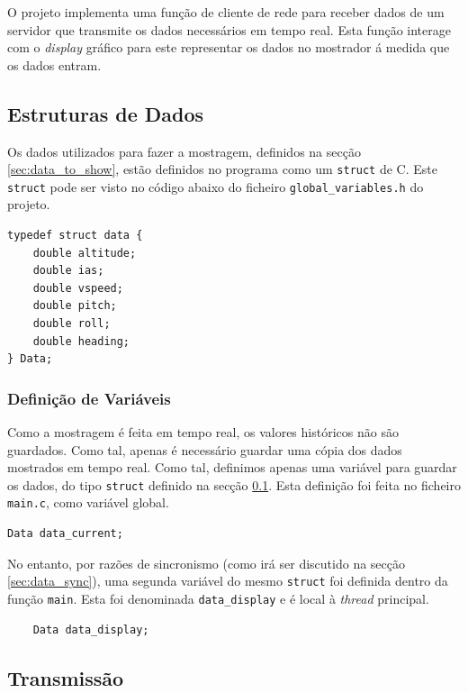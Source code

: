 \documentclass[palatino]{ist-report}
\begin{document}
O projeto implementa uma função de cliente de rede para receber dados de um servidor que transmite os dados necessários em tempo real. Esta função interage com o \textit{display} gráfico para este representar os dados no mostrador á medida que os dados entram.

\subsection{Estruturas de Dados}\label{sec:data_struct}

Os dados utilizados para fazer a mostragem, definidos na secção \ref{sec:data_to_show}, estão definidos no programa como um \texttt{struct} de C. Este \texttt{struct} pode ser visto no código abaixo do ficheiro \texttt{global\_variables.h} do projeto.
\begin{verbatim}
typedef struct data {
    double altitude;
    double ias;
    double vspeed;
    double pitch;
    double roll;
    double heading;
} Data;
\end{verbatim}

\subsubsection{Definição de Variáveis}\label{sec:global_data}

Como a mostragem é feita em tempo real, os valores históricos não são guardados. Como tal, apenas é necessário guardar uma cópia dos dados mostrados em tempo real. Como tal, definimos apenas uma variável para guardar os dados, do tipo \texttt{struct} definido na secção \ref{sec:data_struct}. Esta definição foi feita no ficheiro \texttt{main.c}, como variável global.
\begin{verbatim}
Data data_current;
\end{verbatim}

No entanto, por razões de sincronismo (como irá ser discutido na secção \ref{sec:data_sync}), uma segunda variável do mesmo \texttt{struct} foi definida dentro da função \texttt{main}. Esta foi denominada \texttt{data\_display} e é local à \textit{thread} principal.
\begin{verbatim}
    Data data_display;
\end{verbatim}


\subsection{Transmissão}
\end{document}
